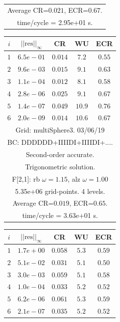 \begin{table}[hbt]
\begin{center}
{\begin{tabular}{|c|c|c|c|c|}
\multicolumn{5}{|c|}{Average CR=$0.021$, ECR=$0.67$.}  \\
\multicolumn{5}{|c|}{time/cycle = 2.95e+01 s.}  \\
\hline 
\end{tabular}
\begin{tabular}{|c|c|c|c|c|} \hline 
 $i$   & $\vert\vert\mbox{res}\vert\vert_\infty$  &  CR     &  WU    & ECR  \\   \hline 
 $ 1$  & $ 6.5e-01$ & $0.014$ & $ 7.2$ & $0.55$ \\ 
 $ 2$  & $ 9.6e-03$ & $0.015$ & $ 9.1$ & $0.63$ \\ 
 $ 3$  & $ 1.1e-04$ & $0.012$ & $ 8.1$ & $0.58$ \\ 
 $ 4$  & $ 2.8e-06$ & $0.025$ & $ 9.1$ & $0.67$ \\ 
 $ 5$  & $ 1.4e-07$ & $0.049$ & $10.9$ & $0.76$ \\ 
 $ 6$  & $ 2.0e-09$ & $0.014$ & $10.6$ & $0.67$ \\ 
\hline 
\multicolumn{5}{|c|}{Grid: multiSphere3. 03/06/19}  \\
\multicolumn{5}{|c|}{BC: DDDDDD+IIIIDI+IIIIDI+....}  \\
\multicolumn{5}{|c|}{Second-order accurate.}  \\
\multicolumn{5}{|c|}{Trigonometric solution.}  \\
\multicolumn{5}{|c|}{F[2,1]: rb $\omega=1.15$, alz $\omega=1.00$}  \\
\multicolumn{5}{|c|}{5.35e+06 grid-points. 4 levels.}  \\
\multicolumn{5}{|c|}{Average CR=$0.019$, ECR=$0.65$.}  \\
\multicolumn{5}{|c|}{time/cycle = 3.63e+01 s.}  \\
\hline 
\end{tabular}
\begin{tabular}{|c|c|c|c|c|} \hline 
 $i$   & $\vert\vert\mbox{res}\vert\vert_\infty$  &  CR     &  WU    & ECR  \\   \hline 
 $ 1$  & $ 1.7e+00$ & $0.058$ & $ 5.3$ & $0.59$ \\ 
 $ 2$  & $ 5.1e-02$ & $0.031$ & $ 5.1$ & $0.50$ \\ 
 $ 3$  & $ 3.0e-03$ & $0.059$ & $ 5.1$ & $0.58$ \\ 
 $ 4$  & $ 1.0e-04$ & $0.033$ & $ 5.2$ & $0.52$ \\ 
 $ 5$  & $ 6.2e-06$ & $0.061$ & $ 5.3$ & $0.59$ \\ 
 $ 6$  & $ 2.1e-07$ & $0.035$ & $ 5.2$ & $0.52$ \\ 

\end{tabular}}
\end{center}
\end{table}
